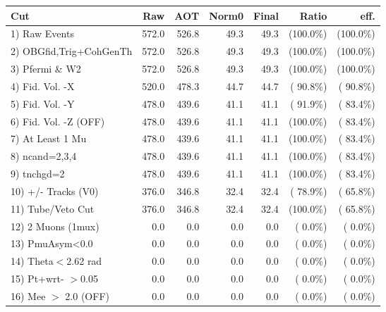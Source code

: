  \begin{table}[h!]\centering
 \begin{tabular}{||l||r|r|r|r|r|r||}
 \hline
 \hline
 Cut & Raw & AOT & Norm0 & Final & Ratio & eff.       \\
 \hline
  1) Raw Events           &        572.0 &        526.8 &         49.3 &         49.3 & (100.0\%) & (100.0\%) \\
  2) OBGfid,Trig+CohGenTh &        572.0 &        526.8 &         49.3 &         49.3 & (100.0\%) & (100.0\%) \\
  3) Pfermi \& W2         &        572.0 &        526.8 &         49.3 &         49.3 & (100.0\%) & (100.0\%) \\
  4) Fid. Vol. -X         &        520.0 &        478.3 &         44.7 &         44.7 & ( 90.8\%) & ( 90.8\%) \\
  5) Fid. Vol. -Y         &        478.0 &        439.6 &         41.1 &         41.1 & ( 91.9\%) & ( 83.4\%) \\
  6) Fid. Vol. -Z (OFF)   &        478.0 &        439.6 &         41.1 &         41.1 & (100.0\%) & ( 83.4\%) \\
  7) At Least 1 Mu        &        478.0 &        439.6 &         41.1 &         41.1 & (100.0\%) & ( 83.4\%) \\
  8) ncand=2,3,4          &        478.0 &        439.6 &         41.1 &         41.1 & (100.0\%) & ( 83.4\%) \\
  9) tnchgd=2             &        478.0 &        439.6 &         41.1 &         41.1 & (100.0\%) & ( 83.4\%) \\
 10) +/- Tracks (V0)      &        376.0 &        346.8 &         32.4 &         32.4 & ( 78.9\%) & ( 65.8\%) \\
 11) Tube/Veto Cut        &        376.0 &        346.8 &         32.4 &         32.4 & (100.0\%) & ( 65.8\%) \\
 12) 2 Muons (1mux)       &          0.0 &          0.0 &          0.0 &          0.0 & (  0.0\%) & (  0.0\%) \\
 13) PmuAsym<0.0          &          0.0 &          0.0 &          0.0 &          0.0 & (  0.0\%) & (  0.0\%) \\
 14) Theta$<$2.62 rad     &          0.0 &          0.0 &          0.0 &          0.0 & (  0.0\%) & (  0.0\%) \\
 15) Pt+wrt- $>$0.05      &          0.0 &          0.0 &          0.0 &          0.0 & (  0.0\%) & (  0.0\%) \\
 16) Mee $>$ 2.0  (OFF)   &          0.0 &          0.0 &          0.0 &          0.0 & (  0.0\%) & (  0.0\%) \\

\end{tabular}
\end{table}
